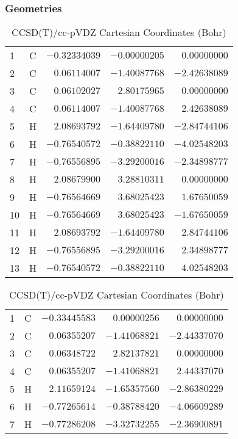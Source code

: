 \documentclass[10pt,oneside]{article}
\begin{document}
\begin{table}[h!]
\subsubsection*{Geometries}
\begin{multicols}{2}
\centering
\caption{CCSD(T)/cc-pVTZ Cartesian Coordinates (Bohr)}
\begin{tabular}{llrrr}
\toprule
1  & C  & $-0.32334039$ & $-0.00000205$ & $ 0.00000000$ \\
2  & C  & $ 0.06114007$ & $-1.40087768$ & $-2.42638089$ \\
3  & C  & $ 0.06102027$ & $ 2.80175965$ & $ 0.00000000$ \\
4  & C  & $ 0.06114007$ & $-1.40087768$ & $ 2.42638089$ \\
5  & H  & $ 2.08693792$ & $-1.64409780$ & $-2.84744106$ \\
6  & H  & $-0.76540572$ & $-0.38822110$ & $-4.02548203$ \\
7  & H  & $-0.76556895$ & $-3.29200016$ & $-2.34898777$ \\
8  & H  & $ 2.08679900$ & $ 3.28810311$ & $ 0.00000000$ \\
9  & H  & $-0.76564669$ & $ 3.68025423$ & $ 1.67650059$ \\
10 & H  & $-0.76564669$ & $ 3.68025423$ & $-1.67650059$ \\
11 & H  & $ 2.08693792$ & $-1.64409780$ & $ 2.84744106$ \\
12 & H  & $-0.76556895$ & $-3.29200016$ & $ 2.34898777$ \\
13 & H  & $-0.76540572$ & $-0.38822110$ & $ 4.02548203$ \\
\bottomrule
\end{tabular}
\caption{CCSD(T)/cc-pVDZ Cartesian Coordinates (Bohr)}
\begin{tabular}{llrrr}
\toprule
1  & C  & $-0.33445583$ & $ 0.00000256$ & $ 0.00000000$ \\
2  & C  & $ 0.06355207$ & $-1.41068821$ & $-2.44337070$ \\
3  & C  & $ 0.06348722$ & $ 2.82137821$ & $ 0.00000000$ \\
4  & C  & $ 0.06355207$ & $-1.41068821$ & $ 2.44337070$ \\
5  & H  & $ 2.11659124$ & $-1.65357560$ & $-2.86380229$ \\
6  & H  & $-0.77265614$ & $-0.38788420$ & $-4.06609289$ \\
7  & H  & $-0.77286208$ & $-3.32732255$ & $-2.36900891$ \\

\end{tabular}
\end{multicols}
\end{table}
\end{document}
